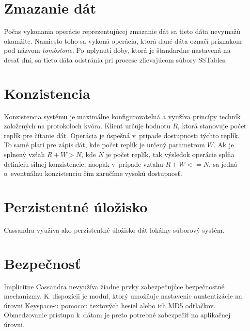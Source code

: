 \documentclass[11pt,twoside,a4paper]{book}
\begin{document}
\section{Zmazanie dát}
Počas vykonania operácie reprezentujúcej zmazanie dát sa tieto dáta nevymažú okamžite. Namiesto toho sa vykoná operácia, ktorá dané dáta označí príznakom pod názvom \emph{tombstone}. Po uplynutí doby, ktorá je štandardne nastavená na desať dní, sa tieto dáta odstránia pri procese zlievajúcom súbory SSTables.
 

\section{Konzistencia}

Konzistencia systému je maximálne konfigurovateľná a využíva princípy techník založených na protokoloch kvóra. Klient určuje hodnotu $R$, ktorá stanovuje počet replík pre čítanie dát. Operácia je úspešná v~prípade dostupnosti týchto replík. To samé platí pre zápis dát, kde počet replík je určený parametrom $W$. Ak je splnený vzťah $R + W > N$, kde $N$ je počet replík, tak výsledok operácie spĺňa definíciu silnej konzistencie, naopak v~prípade vzťahu $R + W <= N$, sa jedná o~eventuálnu konzistenciu čím zaručíme vysokú dostupnosť.


\section{Perzistentné úložisko}

Cassandra využíva ako perzistentné úložisko dát lokálny súborový systém.


\section{Bezpečnosť}

Implicitne Cassandra nevyužíva žiadne prvky zabezpečujúce bezpečnostné mechanizmy. K~dispozícii je modul, ktorý umožňuje nastavenie auntentizácie na úrovni Keyspace-u pomocou textových hesiel alebo ich MD5 odtlačkov. Obmedzovanie prístupu k~dátam je preto potrebné zabezpečiť na aplikačnej úrovni.



\end{document}
